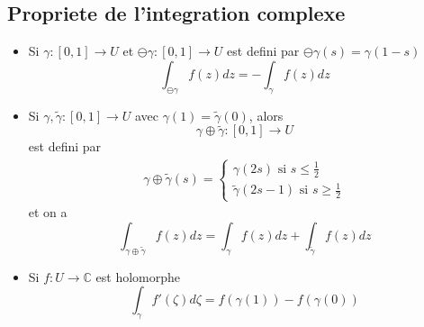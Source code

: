 \documentclass[../main.tex]{subfiles}
\begin{document}
\subsection*{Propriete de l'integration complexe}
\begin{itemize}
	\item Si $\gamma: [ 0,1] \to U$ et $\ominus \gamma: [ 0,1] \to U$ est defini par $\ominus \gamma( s) = \gamma( 1-s) $ 
		\[ 
			\int_{ \ominus \gamma }^{  }f( z) dz = - \int_{ \gamma }^{  }f( z) dz
		\]
		
	\item Si $\gamma,\tilde\gamma: [ 0,1] \to U$ avec $\gamma( 1) =\tilde\gamma( 0) $, alors
		\[ 
		\gamma\oplus\tilde\gamma: [ 0,1] \to U
		\]
		est defini par
		\begin{align*}
			\gamma\oplus\tilde\gamma( s) = 
			\begin{cases}
				\gamma( 2s) \text{ si } s \leq \frac{1}{2}\\
				\tilde\gamma( 2s-1) \text{ si } s \geq \frac{1}{2}
			\end{cases}
		\end{align*}
		et on a
		\[ 
			\int_{ \gamma\oplus\tilde\gamma }^{  } f( z) dz = \int_{ \gamma }^{  }f( z) dz + \int_{ \tilde\gamma }^{  }f( z) dz
		\]
	
	\item Si $f:U \to \mathbb{C}$ est holomorphe
		\[ 
			\int_{ \gamma }^{  } f'( \zeta) d\zeta = f( \gamma( 1) ) - f( \gamma( 0) ) 
		\]
		
		
\end{itemize}
\end{document}
